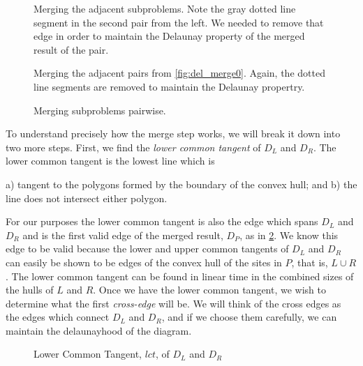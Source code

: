 \documentclass[12pt,twoside]{reedthesis}
\begin{document}
    \begin{figure}[!htb]
    \centering
      \begin{subtable}{\textwidth}
        \centering
        
        \caption{Merging the adjacent subproblems. Note the gray dotted line segment in the second pair from the left. We needed to remove that edge in order to maintain the Delaunay property of the merged result of the pair.}
        \label{fig:del_merge0}
      \end{subtable}

      \begin{subtable}{\textwidth}
        \centering
        
        \caption{Merging the adjacent pairs from \cref{fig:del_merge0}. Again, the dotted line segments are removed to maintain the Delaunay propertry.}
        \label{fig:del_merge1}
      \end{subtable}
      \caption{Merging subproblems pairwise.}
      \label{fig:del_merge_not_final}
    \end{figure}

    To understand precisely how the merge step works, we will break it down into two more steps. First, we find the \emph{lower common tangent} of $D_{L}$ and $D_{R}$. The lower common tangent is the lowest line which is\begin{inparaenum} a) tangent to the polygons formed by the boundary of the convex hull; and b) the line does not intersect either polygon.\end{inparaenum} For our purposes the lower common tangent is also the edge which spans $D_{L}$ and $D_{R}$ and is the first valid edge of the merged result, $D_{P}$, as in \cref{fig:lct}. We know this edge to be valid because the lower and upper common tangents of $D_{L}$ and $D_{R}$ can easily be shown to be edges of the convex hull of the sites in $P$, that is, $L \cup R$. The lower common tangent can be found in linear time in the combined sizes of the hulls of $L$ and $R$. Once we have the lower common tangent, we wish to determine what the first \emph{cross-edge} will be. We will think of the cross edges as the edges which connect $D_{L}$ and $D_{R}$, and if we choose them carefully, we can maintain the delaunayhood of the diagram.\par

    \begin{figure}[!htb]
      \centering
      
      \caption{Lower Common Tangent, $lct$, of $D_{L}$ and $D_{R}$}
      \label{fig:lct}
    \end{figure}
\end{document}
